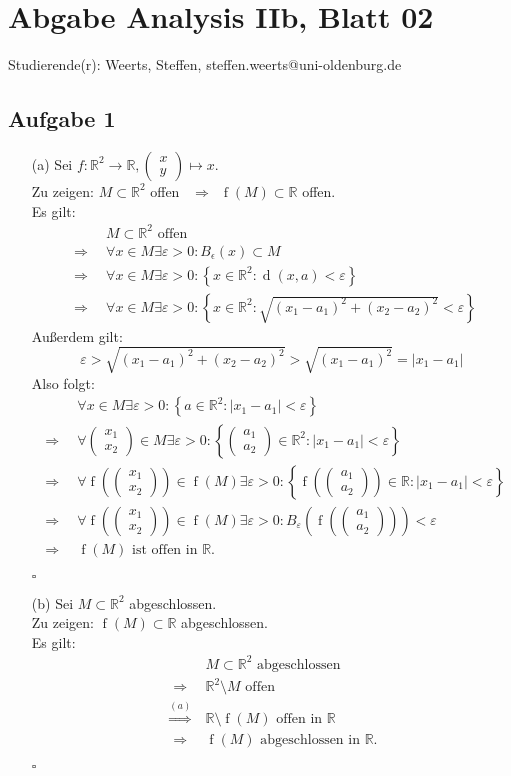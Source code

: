 \documentclass[12pt]{article}
\newcommand{\QED}{\begin{flushright} $\square$ \end{flushright}}
\newcommand{\df}{\enspace\Longrightarrow\enspace}
\newcommand{\koeff}[2]{\begin{pmatrix}#1 \\ #2\end{pmatrix}}
\newcommand{\f}{\operatorname{f}}
\renewcommand{\d}{\operatorname{d}}
\begin{document}
\section*{Abgabe Analysis IIb, Blatt 02}

Studierende(r): Weerts, Steffen, steffen.weerts@uni-oldenburg.de

\subsection*{Aufgabe 1}
\begin{enumerate}
	\item[(a)] Sei $f:\mathbb{R}^2\rightarrow\mathbb{R},\koeff{x}{y}\mapsto x$. \\
	Zu zeigen: $M\subset\mathbb{R}^2$ offen $\df\f(M)\subset\mathbb{R}$ offen. \\
	Es gilt:
	\begin{align*}
		&M\subset\mathbb{R}^2\text{ offen} \\
		\df &\forall x\in M\exists\varepsilon>0:B_{\epsilon}(x)\subset M \\
		\df &\forall x\in M\exists\varepsilon>0:\left\{ x\in\mathbb{R}^2:\d(x,a)<\varepsilon\right\} \\	
		\df &\forall x\in M\exists\varepsilon>0:\left\{ x\in\mathbb{R}^2:\sqrt{(x_1-a_1)^2+(x_2-a_2)^2}<\varepsilon\right\}
	\end{align*}
	Außerdem gilt: $$\varepsilon>\sqrt{(x_1-a_1)^2+(x_2-a_2)^2}>\sqrt{(x_1-a_1)^2}=\vert x_1-a_1\vert$$
	Also folgt:
	\begin{align*}
		&\forall x\in M\exists\varepsilon>0:\left\{a\in\mathbb{R}^2:\vert x_1-a_1\vert<\varepsilon\right\} \\
		\df &\forall \koeff{x_1}{x_2}\in M\exists\varepsilon>0:\left\{\koeff{a_1}{a_2}\in\mathbb{R}^2:\vert x_1-a_1\vert<\varepsilon\right\} \\
		\df &\forall\f(\koeff{x_1}{x_2})\in\f(M)\exists\varepsilon>0:\left\{\f(\koeff{a_1}{a_2})\in\mathbb{R}:\vert x_1-a_1\vert<\varepsilon\right\} \\
		\df &\forall\f(\koeff{x_1}{x_2})\in\f(M)\exists\varepsilon>0:B_{\varepsilon}\left(\f\left(\koeff{a_1}{a_2}\right)\right)<\varepsilon \\
		\df &\f(M)\text{ ist offen in }\mathbb{R}.
	\end{align*}
	\QED
	
	\item[(b)] Sei $M\subset\mathbb{R}^2$ abgeschlossen. \\
	Zu zeigen: $\f(M)\subset\mathbb{R}$ abgeschlossen. \\
	Es gilt:
	\begin{align*}
		&M\subset\mathbb{R}^2\text{ abgeschlossen} \\
		\df &\mathbb{R}^2\setminus M\text{ offen} \\
		\overset{(a)}{\df} &\mathbb{R}\setminus\f(M)\text{ offen in }\mathbb{R} \\
		\df &\f(M)\text{ abgeschlossen in }\mathbb{R}.
	\end{align*}
	\QED
\end{enumerate}
\end{document}
